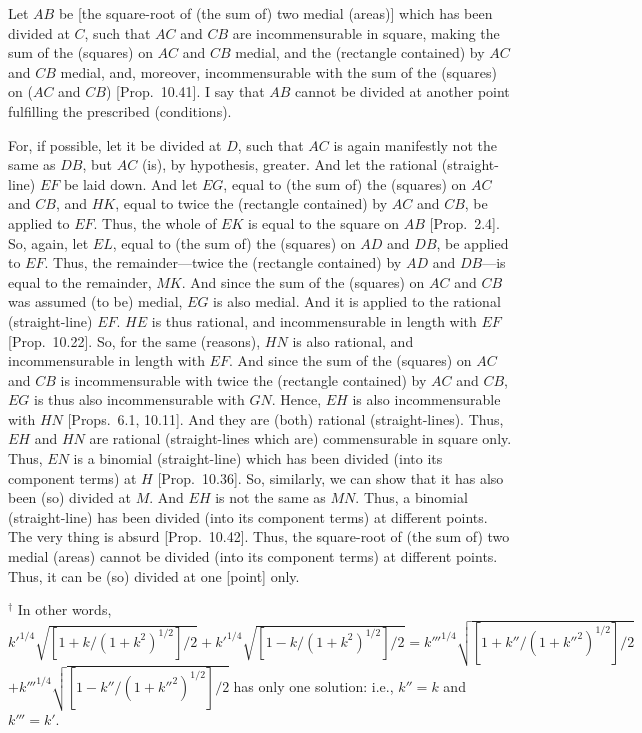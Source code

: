 \begin{Parallel}{}{}
{Let $AB$ be [the square-root of (the sum of) two medial (areas)] which has been divided
at $C$, such that $AC$ and $CB$ are incommensurable in square, making the
sum of the (squares) on $AC$ and $CB$ medial, and the (rectangle contained) by $AC$ and $CB$ medial, and, moreover, incommensurable
with the sum of the (squares) on ($AC$ and $CB$) [Prop.~10.41]. I say that $AB$ cannot be divided
at another point fulfilling the prescribed (conditions).

For, if possible, let it be divided at $D$, such that $AC$ is again
manifestly not the same as $DB$, but $AC$ (is), by hypothesis, greater.
And let the rational (straight-line) $EF$ be laid down. And let $EG$,
equal to (the sum of) the (squares) on $AC$ and $CB$, and $HK$, equal to twice the (rectangle contained) by $AC$ and $CB$,
be applied to $EF$. Thus, the whole of $EK$ is equal to the
square on $AB$ [Prop.~2.4]. So, again, let $EL$, equal to (the sum of) the (squares)
on $AD$ and $DB$, be applied to $EF$. Thus, the remainder---twice
the (rectangle contained) by $AD$ and $DB$---is equal to the remainder, $MK$. And since the sum of the (squares) on $AC$ and $CB$
was assumed (to be) medial, $EG$ is also medial. And it is applied
to the rational (straight-line) $EF$. $HE$ is thus rational, and incommensurable in length with $EF$ [Prop.~10.22].  So, for the same (reasons), 
$HN$ is also rational, and incommensurable in length with $EF$.
And since the sum of the (squares) on $AC$ and $CB$ is incommensurable
with twice the (rectangle contained) by $AC$ and $CB$, $EG$ is thus also
incommensurable with $GN$. Hence, $EH$ is also incommensurable with
$HN$ [Props.~6.1, 10.11].
And they are (both) rational (straight-lines). Thus, $EH$ and $HN$ are rational
(straight-lines which are) commensurable in  square only. Thus, $EN$
is a binomial (straight-line) which has been divided (into its component
terms) at $H$ [Prop.~10.36]. So, similarly, we can show that
it has also been (so) divided at $M$. And $EH$ is not the same  as $MN$. Thus,
a binomial (straight-line) has been divided (into its component
terms) at different points. The
very thing is absurd [Prop.~10.42]. Thus,
the square-root of (the sum of) two medial (areas) cannot be divided (into its component terms) at different
points. Thus, it can be (so) divided at one [point] only.}
\end{Parallel}
{\footnotesize\noindent$^\dag$ In other words, $k'^{1/4}\sqrt{[1+k/(1+k^2)^{1/2}]/2}
+k'^{1/4}\sqrt{[1-k/(1+k^2)^{1/2}]/2}=k'''^{1/4}\sqrt{[1+k''/(1+k''^2)^{1/2}]/2}$\\$
+k'''^{1/4}\sqrt{[1-k''/(1+k''^2)^{1/2}]/2}$ has only one solution: {i.e.}, $k''=k$ and $k'''=k'$.}

